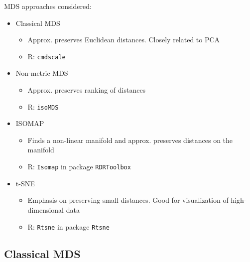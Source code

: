\documentclass[a4paper]{article}
\begin{document}
MDS approaches considered:
\begin{itemize}
    \item Classical MDS
    \begin{itemize}
        \item Approx. preserves Euclidean distances. Closely related to PCA
        \item R: \texttt{cmdscale}
    \end{itemize}
    \item Non-metric MDS
    \begin{itemize}
        \item Approx. preserves ranking of distances
        \item R: \texttt{isoMDS}
    \end{itemize}
    \item ISOMAP
    \begin{itemize}
        \item Finds a non-linear manifold and approx. preserves distances on the manifold
        \item R: \texttt{Isomap} in package \texttt{RDRToolbox}
    \end{itemize}
    \item t-SNE
    \begin{itemize}
        \item Emphasis on preserving small distances. Good for visualization of high-dimensional data
        \item R: \texttt{Rtsne} in package \texttt{Rtsne}
    \end{itemize}
\end{itemize}

\subsection{Classical MDS}
\end{document}
